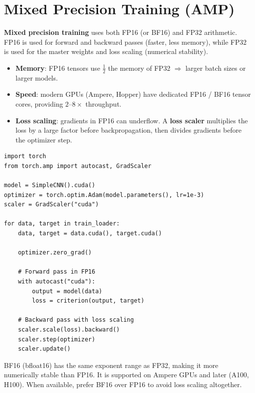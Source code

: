 \section{Mixed Precision Training (AMP)}
\label{sec:amp}

\textbf{Mixed precision training} uses both FP16
(or BF16) and FP32 arithmetic. FP16 is used for forward and backward
passes (faster, less memory), while FP32 is used for the master weights
and loss scaling (numerical stability).

\begin{keyformulas}[title=\textbf{Mixed precision benefits}]
\begin{itemize}
  \item \textbf{Memory}: FP16 tensors use $\frac{1}{2}$ the memory of
    FP32 $\Rightarrow$ larger batch sizes or larger models.
  \item \textbf{Speed}: modern GPUs (Ampere, Hopper) have dedicated FP16
    / BF16 tensor cores, providing $2\text{--}8\times$ throughput.
  \item \textbf{Loss scaling}: gradients in FP16 can underflow.
    A \textbf{loss scaler} multiplies the loss by a large factor before
    backpropagation, then divides gradients before the optimizer step.
\end{itemize}
\end{keyformulas}

\begin{codeblock}[title=\textbf{PyTorch AMP example}]
\begin{verbatim}
import torch
from torch.amp import autocast, GradScaler

model = SimpleCNN().cuda()
optimizer = torch.optim.Adam(model.parameters(), lr=1e-3)
scaler = GradScaler("cuda")

for data, target in train_loader:
    data, target = data.cuda(), target.cuda()

    optimizer.zero_grad()

    # Forward pass in FP16
    with autocast("cuda"):
        output = model(data)
        loss = criterion(output, target)

    # Backward pass with loss scaling
    scaler.scale(loss).backward()
    scaler.step(optimizer)
    scaler.update()
\end{verbatim}
\end{codeblock}

\begin{remark}
BF16 (bfloat16) has the same exponent range as FP32, making it more
numerically stable than FP16. It is supported on Ampere GPUs and later
(A100, H100). When available, prefer BF16 over FP16 to avoid loss scaling
altogether.
\end{remark}

